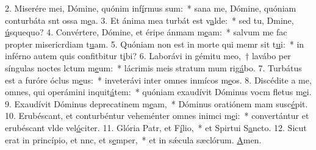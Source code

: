 2. Miserére mei, Dómine, quónim inf\uline{í}rmus sum:~* sana me, Dómine, quóniam conturbáta snt ossa m\uline{e}a.
3. Et ánima mea turbát est v\uline{a}lde:~* sed tu, Dmine, \uline{ú}squequo?
4. Convértere, Dómine, et éripe ánmam m\uline{e}am:~* salvum me fac propter misericrdiam t\uline{u}am.
5. Quóniam non est in morte qui memr sit t\uline{u}i:~* in inférno autem quis confitbitur t\uline{i}bi?
6. Laborávi in gémitu meo,~† lavábo per síngulas noctes lctum m\uline{e}um:~* lácrimis meis stratum mum rig\uline{á}bo.
7. Turbátus est a furóre óclus m\uline{e}us:~* inveterávi inter omnes inmícos m\uline{e}os.
8. Discédite a me, omnes, qui operámini inquit\uline{á}tem:~* quóniam exaudívit Dóminus vocm fletus m\uline{e}i.
9. Exaudívit Dóminus deprecatinem m\uline{e}am,~* Dóminus oratiónem mam susc\uline{é}pit.
10. Erubéscant, et conturbéntur veheménter omnes inimci m\uline{e}i:~* convertántur et erubéscant vlde vel\uline{ó}citer.
11. Glória Patr, et F\uline{í}lio,~* et Spirtui S\uline{a}ncto.
12. Sicut erat in princípio, et nnc, et s\uline{e}mper,~* et in sǽcula sæclórum. \uline{A}men.
